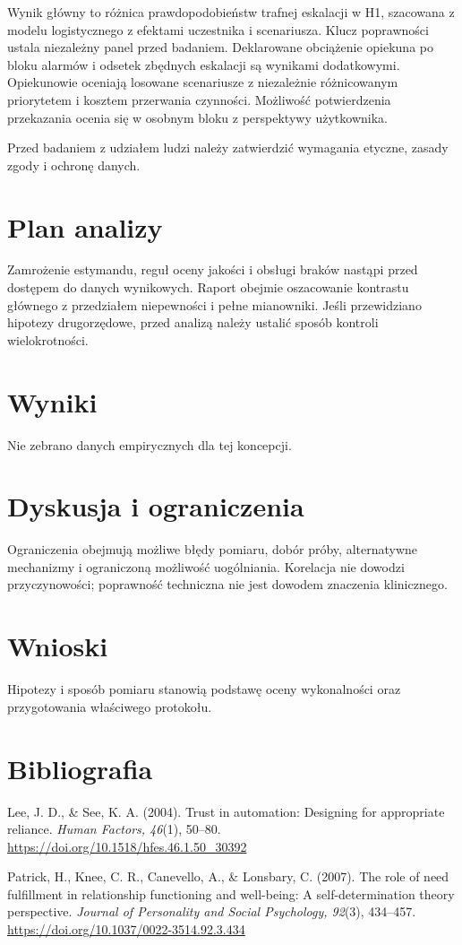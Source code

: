 \documentclass[11pt,a4paper]{article}
\begin{document}
Wynik główny to różnica prawdopodobieństw trafnej eskalacji w H1, szacowana z modelu logistycznego z efektami uczestnika i scenariusza. Klucz poprawności ustala niezależny panel przed badaniem. Deklarowane obciążenie opiekuna po bloku alarmów i odsetek zbędnych eskalacji są wynikami dodatkowymi. Opiekunowie oceniają losowane scenariusze z niezależnie różnicowanym priorytetem i kosztem przerwania czynności. Możliwość potwierdzenia przekazania ocenia się w osobnym bloku z perspektywy użytkownika.

Przed badaniem z udziałem ludzi należy zatwierdzić wymagania etyczne, zasady zgody i ochronę danych.

\section{Plan analizy}

Zamrożenie estymandu, reguł oceny jakości i obsługi braków nastąpi przed dostępem do danych wynikowych. Raport obejmie oszacowanie kontrastu głównego z przedziałem niepewności i pełne mianowniki. Jeśli przewidziano hipotezy drugorzędowe, przed analizą należy ustalić sposób kontroli wielokrotności.

\section{Wyniki}

Nie zebrano danych empirycznych dla tej koncepcji.

\section{Dyskusja i ograniczenia}

Ograniczenia obejmują możliwe błędy pomiaru, dobór próby, alternatywne mechanizmy i ograniczoną możliwość uogólniania. Korelacja nie dowodzi przyczynowości; poprawność techniczna nie jest dowodem znaczenia klinicznego.

\section{Wnioski}

Hipotezy i sposób pomiaru stanowią podstawę oceny wykonalności oraz przygotowania właściwego protokołu.

\section*{Bibliografia}

{\setlength{\parindent}{0pt}
\setlength{\parskip}{5pt}
\hangindent=1.27cm
Lee, J. D., \& See, K. A. (2004). Trust in automation: Designing for appropriate reliance. \textit{Human Factors, 46}(1), 50--80. \url{https://doi.org/10.1518/hfes.46.1.50_30392}\par
\hangindent=1.27cm
Patrick, H., Knee, C. R., Canevello, A., \& Lonsbary, C. (2007). The role of need fulfillment in relationship functioning and well-being: A self-determination theory perspective. \textit{Journal of Personality and Social Psychology, 92}(3), 434--457. \url{https://doi.org/10.1037/0022-3514.92.3.434}\par
}
\end{document}
